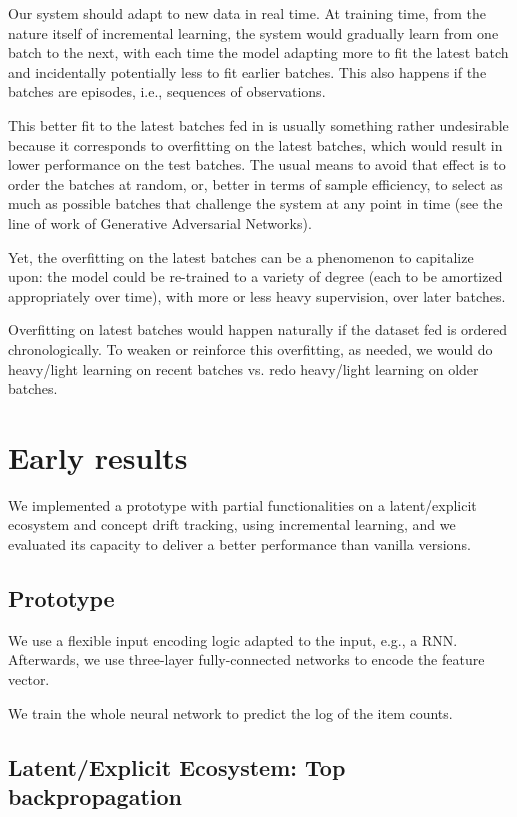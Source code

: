 Our system should adapt to new data in real time. At training time, from the nature itself of incremental learning, the system would gradually learn from one batch to the next, with each time the model adapting more to fit the latest batch and incidentally potentially less to fit earlier batches. This also happens if the batches are episodes, i.e., sequences of observations.

This better fit to the latest batches fed in is usually something rather undesirable because it corresponds to overfitting on the latest batches, which would result in lower performance on the test batches. The usual means to avoid that effect is to order the batches at random, or, better in terms of sample efficiency, to select as much as possible batches that challenge the system at any point in time (see the line of work of Generative Adversarial Networks).

Yet, the overfitting on the latest batches can be a phenomenon to capitalize upon: the model could be re-trained to a variety of degree (each to be amortized appropriately over time), with more or less heavy supervision, over later batches.

Overfitting on latest batches would happen naturally if the dataset fed is ordered chronologically. To weaken or reinforce this overfitting, as needed, we would do heavy/light learning on recent batches vs. redo heavy/light learning on older batches.




\section{Early results}
\label{sec:results}

We implemented a prototype with partial functionalities on a latent/explicit ecosystem and concept drift tracking, using incremental learning, and we evaluated its capacity to deliver a better performance than vanilla versions.

\subsection{Prototype}

We use a flexible input encoding logic adapted to the input, e.g., a RNN. Afterwards, we use three-layer fully-connected networks to encode the feature vector.

We train the whole neural network to predict the log of the item counts.


\subsection{Latent/Explicit Ecosystem: Top backpropagation}

